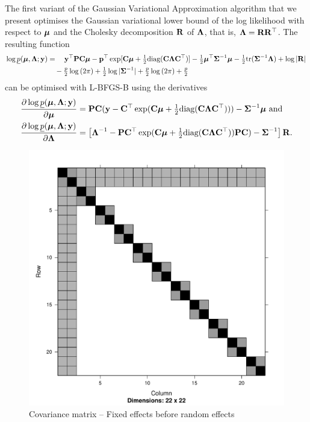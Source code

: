 \documentclass{amsart}[12pt]
\begin{document}
			The first variant of the Gaussian Variational Approximation algorithm that we present optimises the
			Gaussian variational lower bound of the log likelihood with respect to ${\boldsymbol \mu}$ and the Cholesky decomposition
			${\bf R}$ of   ${\boldsymbol \Lambda}$, that is, ${\boldsymbol \Lambda} = {\bf R} {\bf R}^\top$. The resulting function
			\begin{align*}
				\log \underline{p}({\boldsymbol \mu}, {\boldsymbol \Lambda}; {\bf y}) & = \quad {\bf y}^\top{\bf P} {\bf C} {\boldsymbol\mu} - {\bf p}^\top \exp[{\bf C} {\boldsymbol \mu} + \tfrac{1}{2} \text{diag}({\bf C} {\boldsymbol \Lambda} {\bf C}^\top)] - \tfrac{1}{2} {\boldsymbol \mu}^\top {\boldsymbol\Sigma}^{-1} {\boldsymbol \mu} - \tfrac{1}{2} \text{tr}{({\boldsymbol\Sigma}^{-1} {\boldsymbol\Lambda})} + \log{|{\bf R}|} \\
				                                        & \quad - \tfrac{p}{2} \log{(2 \pi)} + \tfrac{1}{2} \log{|{\boldsymbol\Sigma}^{-1}|} + \tfrac{p}{2} \log{(2 \pi)} + \tfrac{p}{2}                                                                              
			\end{align*}
			can be optimised with L-BFGS-B using the derivatives
			\begin{align*}
				\frac{\partial \log \underline{p}({\boldsymbol \mu}, {\boldsymbol \Lambda}; {\bf y})}{\partial {\boldsymbol\mu}}     & = {\bf P} {\bf C} ({\bf y} - {\bf C}^\top \exp({\bf C} {\boldsymbol \mu} + \tfrac{1}{2} \text{diag}{({\bf C}{\boldsymbol\Lambda}{\bf C}^\top)})) - {\boldsymbol \Sigma}^{-1} {\boldsymbol \mu} \text{ and}                \\
				\frac{\partial \log \underline{p}({\boldsymbol \mu}, {\boldsymbol \Lambda}; {\bf y})}{\partial {\boldsymbol\Lambda}} & = \left [{\boldsymbol \Lambda}^{-1} - {\bf P} {\bf C}^\top \exp({\bf C} {\boldsymbol \mu} + \tfrac{1}{2} \text{diag}({\bf C} {\boldsymbol \Lambda} {\bf C}^\top)) {\bf P} {\bf C}) - {\boldsymbol \Sigma}^{-1} \right ] {\bf R}. 
			\end{align*}
			
			\begin{figure}[p]
				\caption{\tiny Covariance matrix -- Fixed effects before random effects}
				\label{fig:covfixedrandom}
				\includegraphics[scale=.25]{mX_mZ_mLambda.pdf}
			\end{figure}
				
\end{document}
